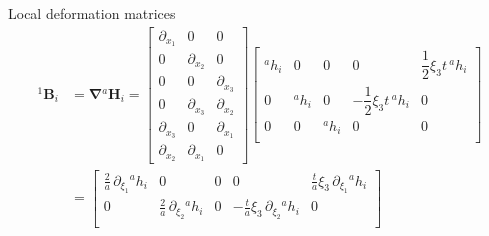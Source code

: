\documentclass[aspectratio=169]{beamer}
\begin{document}
\begin{frame}{Local deformation matrices}
  \small\vspace{-0.3cm}
  \begin{align*}
    {}^1\mathbf B_i & =\boldsymbol\nabla {}^a\mathbf H_i = \begin{bmatrix}
                                                             \partial_{x_1} & 0              & 0              \\
                                                             0              & \partial_{x_2} & 0              \\
                                                             0              & 0              & \partial_{x_3} \\
                                                             0              & \partial_{x_3} & \partial_{x_2} \\
                                                             \partial_{x_3} & 0              & \partial_{x_1} \\
                                                             \partial_{x_2} & \partial_{x_1} & 0
                                                           \end{bmatrix}\begin{bmatrix}
                                                                          {}^a h_i & 0        & 0        & 0                                & \dfrac{1}{2}\xi_3 t \, {}^a h_i \\
                                                                          0        & {}^a h_i & 0        & -\dfrac{1}{2}\xi_3 t \, {}^a h_i & 0                               \\
                                                                          0        & 0        & {}^a h_i & 0                                & 0                               \\\end{bmatrix}                                                                \\[1em]
                    & =\begin{bmatrix}
                         \frac{2}{a} \, \partial_{\xi_1}{}^a h_i & 0                                       & 0                                       & 0                                             & \frac{t}{a}\xi_3 \, \partial_{\xi_1}{}^a h_i \\[0.4em]
                         0                                       & \frac{2}{a} \, \partial_{\xi_2}{}^a h_i & 0                                       & -\frac{t}{a}\xi_3 \, \partial_{\xi_2}{}^a h_i & 0                                            \\[0.4em]

\end{bmatrix}
\end{align*}
\end{frame}
\end{document}
